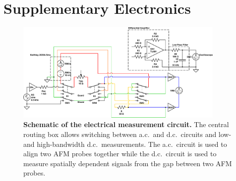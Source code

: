 \documentclass[12pt, a4paper, oneside]{book}
\begin{document}


\section{Supplementary Electronics}

\begin{figure}[t]
\centering
\includegraphics[width=0.9\textwidth]{figures/tip_experiment_circuit_design}
\caption[Schematic of the electrical measurement circuit.]{\textbf{Schematic of the electrical measurement circuit.} The central routing box allows switching between a.c.\ and d.c.\ circuits and low-and high-bandwidth d.c.\ measurements. The a.c.\ circuit is used to align two AFM probes together while the d.c.\ circuit is used to measure spatially dependent signals from the gap between two AFM probes.}
\label{fig:circuit_design}
\end{figure}
\end{document}
